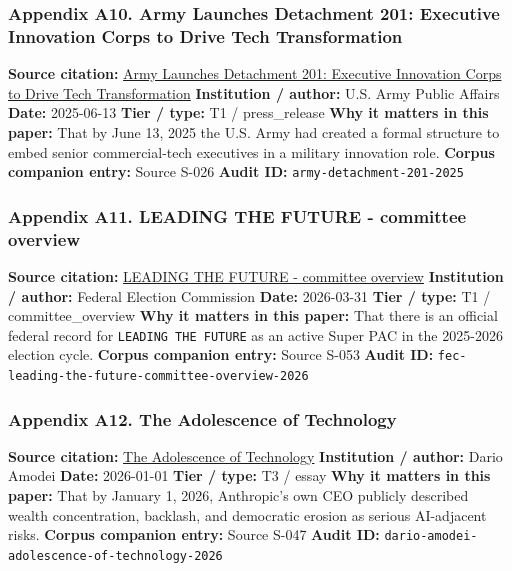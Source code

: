 \documentclass[
  american,
  11pt,
  letterpaper,
]{article}
\begin{document}
\subsubsection{Appendix A10. Army Launches Detachment 201: Executive
Innovation Corps to Drive Tech
Transformation}\label{appendix-a10-army-launches-detachment-201-executive-innovation-corps-to-drive-tech-transformation}

\textbf{Source citation:}
\href{https://www.army.mil/article/286317/army_launches_detachment_201_executive_innovation_corps_to_drive_tech_transformation}{Army
Launches Detachment 201: Executive Innovation Corps to Drive Tech
Transformation} \textbf{Institution / author:} U.S. Army Public Affairs
\textbf{Date:} 2025-06-13 \textbf{Tier / type:} T1 / press\_release
\textbf{Why it matters in this paper:} That by June 13, 2025 the U.S.
Army had created a formal structure to embed senior commercial-tech
executives in a military innovation role. \textbf{Corpus companion
entry:} Source S-026 \textbf{Audit ID:}
\texttt{army-detachment-201-2025}

\subsubsection{Appendix A11. LEADING THE FUTURE - committee
overview}\label{appendix-a11-leading-the-future-committee-overview}

\textbf{Source citation:}
\href{https://www.fec.gov/data/committee/C00916114/}{LEADING THE FUTURE
- committee overview} \textbf{Institution / author:} Federal Election
Commission \textbf{Date:} 2026-03-31 \textbf{Tier / type:} T1 /
committee\_overview \textbf{Why it matters in this paper:} That there is
an official federal record for \texttt{LEADING\ THE\ FUTURE} as an
active Super PAC in the 2025-2026 election cycle. \textbf{Corpus
companion entry:} Source S-053 \textbf{Audit ID:}
\texttt{fec-leading-the-future-committee-overview-2026}

\subsubsection{Appendix A12. The Adolescence of
Technology}\label{appendix-a12-the-adolescence-of-technology}

\textbf{Source citation:}
\href{https://darioamodei.com/essay/the-adolescence-of-technology}{The
Adolescence of Technology} \textbf{Institution / author:} Dario Amodei
\textbf{Date:} 2026-01-01 \textbf{Tier / type:} T3 / essay \textbf{Why
it matters in this paper:} That by January 1, 2026, Anthropic's own CEO
publicly described wealth concentration, backlash, and democratic
erosion as serious AI-adjacent risks. \textbf{Corpus companion entry:}
Source S-047 \textbf{Audit ID:}
\texttt{dario-amodei-adolescence-of-technology-2026}
\end{document}

